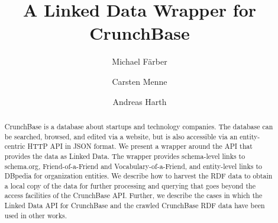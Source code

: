 \documentclass[runningheads,a4paper]{llncs}
\begin{document}
\mainmatter

\title{A Linked Data Wrapper for CrunchBase}

\author{Michael Färber \and
Carsten Menne \and
Andreas Harth}
\maketitle

\begin{abstract}
CrunchBase is a database about startups and technology companies. The database can be searched, browsed, and edited via a website, but is also accessible via an entity-centric HTTP API in JSON format. We present a wrapper around the API that provides the data as Linked Data. The wrapper provides schema-level links to schema.org, Friend-of-a-Friend and Vocabulary-of-a-Friend, and entity-level links to DBpedia for organization entities. We describe how to harvest the RDF data to obtain a local copy of the data for further processing and querying that goes beyond the access facilities of the CrunchBase API. Further, we describe the cases in which the Linked Data API for CrunchBase and the crawled CrunchBase RDF data have been used in other works.

\end{abstract}
\end{document}
